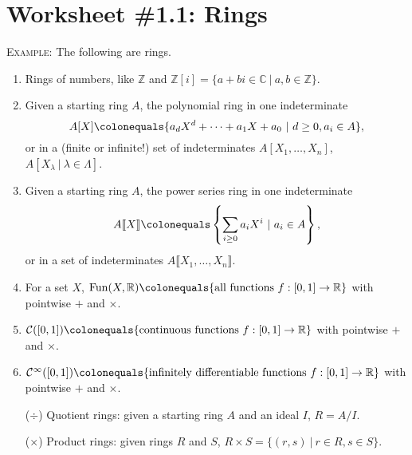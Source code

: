 \documentclass[12pt]{amsart}
\newcommand{\Z}{\mathbb{Z}}
\newcommand{\R}{\mathbb{R}}
\newcommand{\C}{\mathbb{C}}
\newcommand{\showsol}[1]{\def\displaysol{#1}}
\newcommand\ceq{\colonequals}
\begin{document}
\showsol{0}
	
	\thispagestyle{empty}
	
	\section*{Worksheet \#1.1: Rings}
	
	

\begin{framed}
\textsc{Example:} The following are rings.
\begin{enumerate}
\item Rings of numbers, like $\Z$ and $\Z[i] = \{ a + b i \in \C \ | \ a,b\in \Z\}$. 
\item Given a starting ring $A$, the polynomial ring in one indeterminate \[A[X] \ceq \{ a_d X^d + \cdots + a_1 X + a_0 \ | \ d\geq 0, a_i\in A\},\]
 or in a (finite or infinite!\footnotemark) set of indeterminates $A[X_1,\dots,X_n]$, \ $A[ X_\lambda \ | \ \lambda\in \Lambda]$.
 \item Given a starting ring $A$, the power series ring in one indeterminate \[A\llbracket X\rrbracket \ceq \left\{ \sum_{i\geq 0} a_i X^i \ | \  a_i\in A\right\},\]
 or in a set of indeterminates $A\llbracket X_1,\dots,X_n\rrbracket $.
\item For a set $X$, $\mathrm{Fun}(X,\R) \ceq \{ \text{all functions} \ f:[0,1] \to \R \}$ with pointwise $+$ and $\times$.
\item $\mathcal{C}([0,1]) \colonequals \{ \text{continuous functions} \ f:[0,1] \to \R \}$ with pointwise $+$ and $\times$.
\item $\mathcal{C}^\infty([0,1]) \colonequals \{ \text{infinitely differentiable functions} \ f:[0,1] \to \R \}$ with pointwise $+$ and $\times$.
 \item[($\div$)] Quotient rings: given a starting ring $A$ and an ideal $I$, $R=A/I$.
  \item[($\times$)] Product rings: given rings $R$ and $S$, $R\times S = \{(r,s) \ | \ r\in R, s\in S\}$.
\end{enumerate}



\end{framed}
\end{document}
